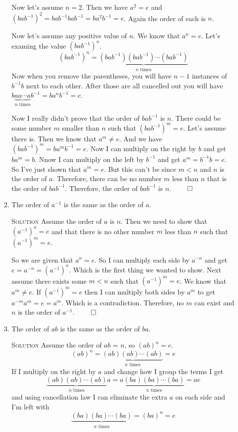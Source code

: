 \documentclass[twoside]{amsart}
\newcommand{\solution}{\textsc{Solution}\xspace}
\newcommand{\blank}{\vspace{5pt}}
\newcommand{\itm}{\blank\item}
\newcommand{\sol}{\blank\noindent\solution}
\begin{document}
\begin{enumerate}[A.]
\begin{enumerate}[1]
      Now let's assume $n=2$. Then we have $a^2 = e$ and
      $(bab^{-1})^2 = bab^{-1}bab^{-1} = ba^2b^{-1} = e$. Again
      the order of each is $n$.

      Now let's assume any positive value of $n$. We know that $a^n=e$.
      Let's examing the value $(bab^{-1})^n$.
      \[
         (bab^{-1})^n = \underbrace{(bab^{-1})(bab^{-1})\cdots
          (bab^{-1})}_{n\text{ times}}
      \]
      Now when you remove the parentheses, you will have $n-1$
      instances of $b^{-1}b$ next to each other. After those are
      all cancelled out you will have $b\underbrace{a a \cdots a}_{
      n\text{ times}}b^{-1} = ba^nb^{-1} = e$. 

      Now I really didn't prove that the order of $bab^{-1}$ is $n$.
      There could be some number $m$ smaller than $n$ such
      that $(bab^{-1})^m = e$. Let's assume there is. Then we know that
      $a^m \ne e$. And we have $(bab^{-1})^m = ba^mb^{-1} = e$. Now
      I can multiply on the right by $b$ and get $ba^m = b$. Nnow I
      can multiply on the left by $b^{-1}$ and get $a^m = b^{-1}b = e$.
      So I've just shown that $a^m = e$. But this can't be since $m < n$
      and $n$ is the order of $a$. Therefore, there can be no number
      $m$ less than $n$ that is the order of $bab^{-1}$. Therefore,
      the order of $bab^{-1}$ is $n$. $\qed$

      \itm The order of $a^{-1}$ is the same as the order of $a$.

      \sol Assume the order of $a$ is $n$. Then we need to show that
      $(a^{-1})^n = e$ and that there is no other number $m$ less than $n$
      such that $(a^{-1})^m = e$.

      So we are given that $a^n = e$. So I can multiply each side
      by $a^{-n}$ and get $e = a^{-n} = (a^{-1})^n$. Which is the
      first thing we wanted to show. Next assume there exists some
      $m < n$ such that $(a^{-1})^m = e$. We know that $a^m \ne e$.
      If $(a^{-1})^m = e$ then I can multiply both sides by $a^m$
      to get $a^{-m}a^m = e = a^m$. Which is a contradiction. Therefore,
      no $m$ can exist and $n$ is the order of $a^{-1}$. $\qed$

      \itm The order of $ab$ is the same as the order of $ba$.

      \sol Assume the order of $ab$ = $n$, so $(ab)^n = e$. 
      \[
         (ab)^n = \underbrace{(ab)(ab) \cdots (ab)}_{n\text{ times}} = e
      \]
      If I multiply on the right by $a$ and change how I group the
      terms I get
      \[
         \underbrace{(ab)(ab) \cdots (ab)}_{n\text{ times}} a =
            a\underbrace{(ba)(ba) \cdots (ba)}_{n\text{ times}} = ae
      \]
      and using cancellation law I can eliminate the extra $a$ on
      each side and I'm left with
      \[
         \underbrace{(ba)(ba) \cdots (ba)}_{n\text{ times}} = (ba)^n = e
      \]


\end{enumerate}
\end{enumerate}
\end{document}
